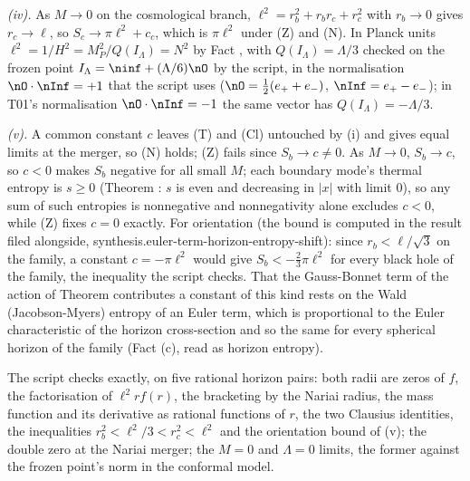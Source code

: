 \emph{(iv).} As $M \to 0$ on the cosmological branch, $\ell^{2} = r_{b}^{2} + r_{b}r_{c} + r_{c}^{2}$ with $r_{b} \to 0$ gives $r_{c} \to \ell$, so $S_{c} \to \pi\ell^{2} + c_{c}$, which is $\pi\ell^{2}$ under (Z) and (N). In Planck units $\ell^{2} = 1/H^{2} = M_{P}^{2}/Q(I_{\Lambda}) = N^{2}$ by Fact , with $Q(I_{\Lambda}) = \Lambda/3$ checked on the frozen point $I_{\Lambda} = \ninf + (\Lambda/6)\nO$ by the script, in the normalisation $\nO\cdot\nInf = +1$ that the script uses ($\nO = \tfrac12(e_{+} + e_{-})$, $\nInf = e_{+} - e_{-}$); in T01's normalisation $\nO\cdot\nInf = -1$ the same vector has $Q(I_{\Lambda}) = -\Lambda/3$.

\emph{(v).} A common constant $c$ leaves (T) and (Cl) untouched by (i) and gives equal limits at the merger, so (N) holds; (Z) fails since $S_{b} \to c \neq 0$. As $M \to 0$, $S_{b} \to c$, so $c < 0$ makes $S_{b}$ negative for all small $M$; each boundary mode's thermal entropy is $s \ge 0$ (Theorem : $s$ is even and decreasing in $|x|$ with limit $0$), so any sum of such entropies is nonnegative and nonnegativity alone excludes $c < 0$, while (Z) fixes $c = 0$ exactly. For orientation (the bound is computed in the result filed alongside, synthesis.euler-term-horizon-entropy-shift): since $r_{b} < \ell/\sqrt{3}$ on the family, a constant $c = -\pi\ell^{2}$ would give $S_{b} < -\tfrac23\pi\ell^{2}$ for every black hole of the family, the inequality the script checks. That the Gauss-Bonnet term of the action of Theorem  contributes a constant of this kind rests on the Wald (Jacobson-Myers) entropy of an Euler term, which is proportional to the Euler characteristic of the horizon cross-section and so the same for every spherical horizon of the family (Fact (c), read as horizon entropy).

The script checks exactly, on five rational horizon pairs: both radii are zeros of $f$, the factorisation of $\ell^{2} r f(r)$, the bracketing by the Nariai radius, the mass function and its derivative as rational functions of $r$, the two Clausius identities, the inequalities $r_{b}^{2} < \ell^{2}/3 < r_{c}^{2} < \ell^{2}$ and the orientation bound of (v); the double zero at the Nariai merger; the $M = 0$ and $\Lambda = 0$ limits, the former against the frozen point's norm in the conformal model.
